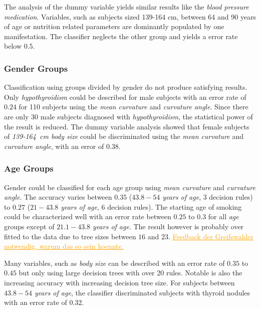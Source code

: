 \documentclass[a4paper,twoside]{style/article}
\newcommand{\com}[1]{\textcolor{orange}{\uline{#1}}}
\begin{document}
The analysis of the dummy variable yields similar results like the \emph{blood pressure medication}.
Variables, such as subjects sized 139-164 cm, between 64 and 90 years of age or nutrition related parameters are dominantly populated by one manifestation.
The classifier neglects the other group and yields a error rate below $0.5$.
\subsubsection{Gender Groups}
Classification using groups divided by gender do not produce satisfying results.
Only \emph{hypothyroidism} could be described for male subjects with an error rate of $0.24$ for 110 subjects using the \emph{mean curvature} and \emph{curvature angle}.
Since there are only 30 male subjects diagnosed with \emph{hypothyroidism}, the statistical power of the result is reduced.
The dummy variable analysis showed that female subjects of \emph{139-164~cm body size} could be discriminated using the \emph{mean curvature} and \emph{curvature angle}, with an error of $0.38$.

\subsubsection{Age Groups}
Gender could be classified for each age group using \emph{mean curvature} and \emph{curvature angle}.
The accuracy varies between $0.35$ (\emph{$43.8-54$ years of age}, 3 decision rules) to $0.27$ (\emph{$21-43.8$ years of age}, 6 decision rules).
The starting age of smoking could be characterized well with an error rate between $0.25$ to $0.3$ for all \emph{age} groups except of \emph{$21.1-43.8$ years of age}.
The result however is probably over fitted to the data due to tree sizes between $16$ and $23$.
\com{Feedback der Greifswalder notwendig, warum das so sein koennte.}

Many variables, such as \emph{body size} can be described with an error rate of $0.35$ to $0.45$ but only using large decision trees with over 20 rules.
Notable is also the increasing accuracy with increasing decision tree size.
For subjects between \emph{$43.8-54$ years of age}, the classifier discriminated subjects with thyroid nodules with an error rate of $0.32$.
\end{document}
